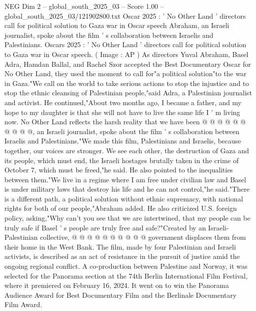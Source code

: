\begin{textsample}{NEG Dim 2 – global\_south\_2025\_03 – Score 1.00 – global\_south\_2025\_03/121902800.txt}  \label{ex:f2_neg_141}
Oscar 2025 : ' No Other Land ' directors call for political solution to Gaza war in Oscar speech Abraham, an Israeli journalist, spoke about the film ' s collaboration between Israelis and Palestinians.
Oscars 2025 : ' No Other Land ' directors call for political solution to Gaza war in Oscar speech. ( Image : AP ) As directors Yuval Abraham, Basel Adra, Hamdan Ballal, and Rachel Szor accepted the Best Documentary Oscar for No Other Land, they used the moment to call for"a political solution"to the war in Gaza."We call on the world to take serious actions to stop the injustice and to stop the ethnic cleansing of Palestinian people,"said Adra, a Palestinian journalist and activist.
He continued,"About two months ago, I became a father, and my hope to my daughter is that she will not have to live the same life I ' m living now.
No Other Land reflects the harsh reality that we have been @ @ @ @ @ @ @ @ @ @, an Israeli journalist, spoke about the film ' s collaboration between Israelis and Palestinians."We made this film, Palestinians and Israelis, because together, our voices are stronger.
We see each other, the destruction of Gaza and its people, which must end, the Israeli hostages brutally taken in the crime of October 7, which must be freed,"he said.
He also pointed to the inequalities between them."We live in a regime where I am free under civilian law and Basel is under military laws that destroy his life and he can not control,"he said."There is a different path, a political solution without ethnic supremacy, with national rights for both of our people,"Abraham added.
He also criticized U.S. foreign policy, asking,"Why can't you see that we are intertwined, that my people can be truly safe if Basel ' s people are truly free and safe?"Created by an Israeli-Palestinian collective, @ @ @ @ @ @ @ @ @ @ government displaces them from their home in the West Bank.
The film, made by four Palestinian and Israeli activists, is described as an act of resistance in the pursuit of justice amid the ongoing regional conflict.
A co-production between Palestine and Norway, it was selected for the Panorama section at the 74th Berlin International Film Festival, where it premiered on February 16, 2024.
It went on to win the Panorama Audience Award for Best Documentary Film and the Berlinale Documentary Film Award.

\end{textsample}
